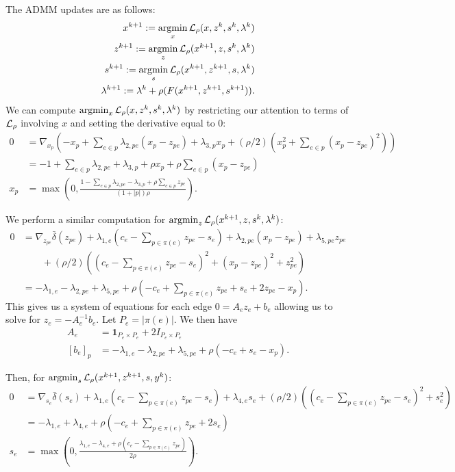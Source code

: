\documentclass[11pt]{article}
\begin{document}
The ADMM updates are as follows:
\begin{equation}
    \begin{aligned}
        x^{k+1} := \operatorname*{argmin}_{x} \mathcal{L}_\rho(x,z^k,s^{k},\lambda^k)\\
        z^{k+1} := \operatorname*{argmin}_{z} \mathcal{L}_\rho(x^{k+1},z,s^{k},\lambda^k)\\
        s^{k+1} := \operatorname*{argmin}_{s} \mathcal{L}_\rho(x^{k+1},z^{k+1},s,\lambda^k)\\
        \lambda^{k+1} := \lambda^k + \rho(F(x^{k+1},z^{k+1},s^{k+1})).
    \end{aligned}
\end{equation}
We can compute $\operatorname*{argmin}_{x} \mathcal{L}_\rho(x,z^k,s^k,\lambda^k)$ by restricting our
attention to terms of $\mathcal{L}_\rho$ involving $x$ and setting the derivative equal to 0:
\begin{align*}
0
&= \nabla_{x_p}(-x_p + \sum_{e\in p}\lambda_{2,pe}(x_p - z_{pe}) + \lambda_{3,p} x_p
+ (\rho/2)(x_p^2 + \sum_{e \in p}(x_p - z_{pe})^2))\\
&= -1 + \sum_{e \in p}\lambda_{2,pe} + \lambda_{3,p} + \rho x_p + \rho\sum_{e \in p} (x_p - z_{pe})\\
x_p &= \max(0,\frac{1 - \sum_{e \in p}\lambda_{2,pe} - \lambda_{3,p} + \rho \sum_{e\in p} z_{pe}}
{(1 + |p|)\rho}).
\end{align*}

We perform a similar computation for $\operatorname*{argmin}_{z} \mathcal{L}_\rho(x^{k+1},z,s^k,\lambda^k)$:
\begin{align*}
0
&= \nabla_{z_{pe}}\bar\delta(z_{pe}) + \lambda_{1,e}(c_e - \sum_{p\in\pi(e)} z_{pe} - s_{e})
    + \lambda_{2,pe}(x_p - z_{pe}) + \lambda_{5,pe}z_{pe}\\
& \qquad + (\rho/2)((c_e - \sum_{p\in\pi(e)} z_{pe} - s_e)^2 + (x_p - z_{pe})^2 + z_{pe}^2)\\
&= -\lambda_{1,e} - \lambda_{2,pe} + \lambda_{5,pe}
    + \rho(-c_e + \sum_{p\in\pi(e)} z_{pe} + s_e  + 2z_{pe} - x_p).
\end{align*}
This gives us a system of equations for each edge $0 = A_ez_e + b_e$
allowing us to solve for $z_e = -A_e^{-1}b_e$.
Let $P_e= |\pi(e)|$. We then have
\begin{align*}
A_e &= \mathbf{1}_{P_e\times P_e} + 2I_{P_e\times P_e}\\
[b_e]_p &= -\lambda_{1,e} - \lambda_{2,pe} + \lambda_{5,pe}
    + \rho(-c_e + s_e - x_p).
\end{align*}

Then, for $\operatorname*{argmin}_{s} \mathcal{L}_\rho(x^{k+1},z^{k+1},s,y^k)$:
\begin{align*}
0
&= \nabla_{s_{e}}\bar\delta(s_{e}) + \lambda_{1,e}(c_e - \sum_{p\in\pi(e)} z_{pe} - s_{e})
 + \lambda_{4,e}s_{e}
    + (\rho/2)((c_e - \sum_{p\in\pi(e)} z_{pe} - s_{e})^2 + s_{e}^2)\\
&= -\lambda_{1,e} + \lambda_{4,e} + \rho(-c_e + \sum_{p\in\pi(e)} z_{pe} + 2s_e)\\
s_{e} &= \max(0,\frac{\lambda_{1,e} - \lambda_{4,e} + \rho(c_e - \sum_{p\in\pi(e)}z_{pe})}{2\rho}).
\end{align*}
\end{document}
